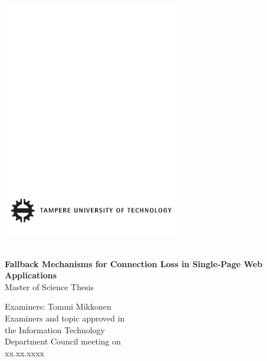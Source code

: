 \thispagestyle{empty}
 
\vspace*{-.5cm}\noindent
 
 
\includegraphics[width=8cm]{assets/tut-logo}
 
\vspace{6.8cm}
 
\\
{\bf\large \textsf{Fallback Mechanisms for Connection Loss in Single-Page Web Applications}}\\
\textsf{Master of Science Thesis}
 
\vspace{8.7cm} %
 
\begin{flushright}
  
\begin{minipage}[c]{6.8cm}
\begin{spacing}{1.0}
\textsf{Examiners: Tommi Mikkonen}\\
\textsf{Examiners and topic approved in}\\ 
\textsf{the Information Technology}\\
\textsf{Department Council meeting on}\\
\textsf{xx.xx.xxxx}\\
\end{spacing}
\end{minipage}
\end{flushright}



